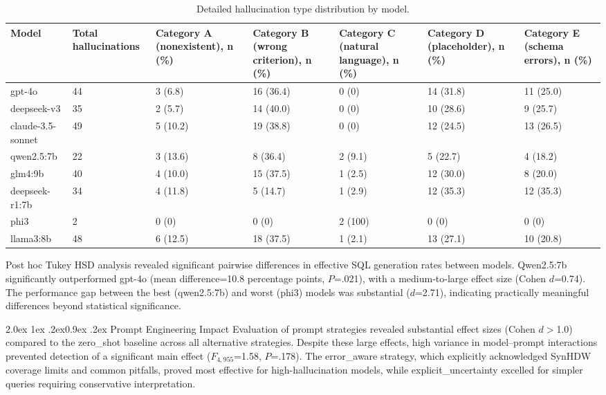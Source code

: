 \documentclass[10pt,twocolumn]{article}
\makeatletter
\renewcommand\subsection{\@startsection{subsection}{2}{\z@}%
  {2.0ex \@plus 1ex \@minus .2ex}{0.9ex \@plus .2ex}%
  {\normalfont\normalsize\bfseries}}
\makeatother
\begin{document}
\begin{table}[!t]
\caption{Detailed hallucination type distribution by model.}
\label{tab:halluctypes}
\centering
\footnotesize
\setlength{\tabcolsep}{3pt}
\begin{tabular}{@{}L{2.6cm}L{1.7cm}L{1.8cm}L{1.8cm}L{1.8cm}L{1.7cm}L{1.7cm}@{}}
\toprule
Model & Total halluci\-nations & Category A (nonexis\-tent), n (\%)
      & Category B (wrong criterion), n (\%)
      & Category C (natural language), n (\%)
      & Category D (place\-holder), n (\%)
      & Category E (schema errors), n (\%)\\
\midrule
gpt-4o            & 44 & 3 (6.8)  & 16 (36.4) & 0 (0)     & 14 (31.8) & 11 (25.0)\\
deepseek-v3       & 35 & 2 (5.7)  & 14 (40.0) & 0 (0)     & 10 (28.6) & 9 (25.7)\\
claude-3.5-sonnet & 49 & 5 (10.2) & 19 (38.8) & 0 (0)     & 12 (24.5) & 13 (26.5)\\
qwen2.5:7b        & 22 & 3 (13.6) & 8 (36.4)  & 2 (9.1)   & 5 (22.7)  & 4 (18.2)\\
glm4:9b           & 40 & 4 (10.0) & 15 (37.5) & 1 (2.5)   & 12 (30.0) & 8 (20.0)\\
deepseek-r1:7b    & 34 & 4 (11.8) & 5 (14.7)  & 1 (2.9)   & 12 (35.3) & 12 (35.3)\\
phi3              & 2  & 0 (0)    & 0 (0)     & 2 (100)   & 0 (0)     & 0 (0)\\
llama3:8b         & 48 & 6 (12.5) & 18 (37.5) & 1 (2.1)   & 13 (27.1) & 10 (20.8)\\
\bottomrule
\end{tabular}
\end{table}

Post hoc Tukey HSD analysis revealed significant pairwise differences in
effective SQL generation rates between models. Qwen2.5:7b significantly
outperformed gpt-4o (mean difference=10.8 percentage points, $P$=.021), with a medium-to-large effect size (Cohen $d$=0.74). The performance gap between the best (qwen2.5:7b)
and worst (phi3) models was substantial ($d$=2.71), indicating practically
meaningful differences beyond statistical significance.

\subsection{Prompt Engineering Impact}
Evaluation of prompt strategies revealed substantial effect sizes (Cohen
$d>$1.0) compared to the zero\_shot baseline across all alternative strategies.
Despite these large effects, high variance in model--prompt interactions
prevented detection of a significant main effect ($F_{4,955}$=1.58, $P$=.178).
The error\_aware strategy, which explicitly acknowledged SynHDW coverage limits
and common pitfalls, proved most effective for high-hallucination models, while
explicit\_uncertainty excelled for simpler queries requiring conservative
interpretation.
\end{document}
